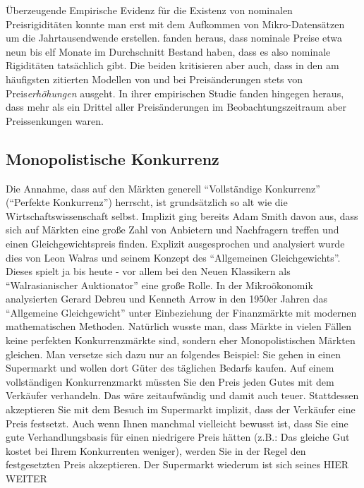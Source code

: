Überzeugende Empirische Evidenz für die Existenz von nominalen Preisrigiditäten konnte man erst mit dem Aufkommen von Mikro-Datensätzen um die Jahrtausendwende erstellen. \textcite{Nakamura2008} fanden heraus, dass nominale Preise etwa neun bis elf Monate im Durchschnitt Bestand haben, dass es also nominale Rigiditäten tatsächlich gibt. Die beiden kritisieren aber auch, dass in den am häufigsten zitierten Modellen von \textcite{Taylor1980} und \textcite{Calvo1983} bei Preisänderungen stets von Preis\textit{erhöhungen} ausgeht. In ihrer empirischen Studie fanden \textcite[S. 1442]{Nakamura2008} hingegen heraus, dass mehr als ein Drittel aller Preisänderungen im Beobachtungszeitraum aber Preissenkungen waren.


\subsection{Monopolistische Konkurrenz}
\label{Monopol}
Die Annahme, dass auf den Märkten generell "`Vollständige Konkurrenz"' ("`Perfekte Konkurrenz"') herrscht, ist grundsätzlich so alt wie die Wirtschaftswissenschaft selbst. Implizit ging bereits Adam Smith davon aus, dass sich auf Märkten eine große Zahl von Anbietern und Nachfragern treffen und einen Gleichgewichtspreis finden. Explizit ausgesprochen und analysiert wurde dies von Leon Walras und seinem Konzept des "`Allgemeinen Gleichgewichts"'. Dieses spielt ja bis heute - vor allem bei den Neuen Klassikern als "`Walrasianischer Auktionator"' eine große Rolle. In der Mikroökonomik analysierten Gerard Debreu und Kenneth Arrow in den 1950er Jahren das "`Allgemeine Gleichgewicht"' unter Einbeziehung der Finanzmärkte mit modernen mathematischen Methoden. Natürlich wusste man, dass Märkte in vielen Fällen keine perfekten Konkurrenzmärkte sind, sondern eher Monopolistischen Märkten gleichen. Man versetze sich dazu nur an folgendes Beispiel: Sie gehen in einen Supermarkt und wollen dort Güter des täglichen Bedarfs kaufen. Auf einem vollständigen Konkurrenzmarkt müssten Sie den Preis jeden Gutes mit dem Verkäufer verhandeln. Das wäre zeitaufwändig und damit auch teuer. Stattdessen akzeptieren Sie mit dem Besuch im Supermarkt implizit, dass der Verkäufer eine Preis festsetzt. Auch wenn Ihnen manchmal vielleicht bewusst ist, dass Sie eine gute Verhandlungsbasis für einen niedrigere Preis hätten (z.B.: Das gleiche Gut kostet bei Ihrem Konkurrenten weniger), werden Sie in der Regel den festgesetzten Preis akzeptieren. Der Supermarkt wiederum ist sich seines  HIER WEITER



